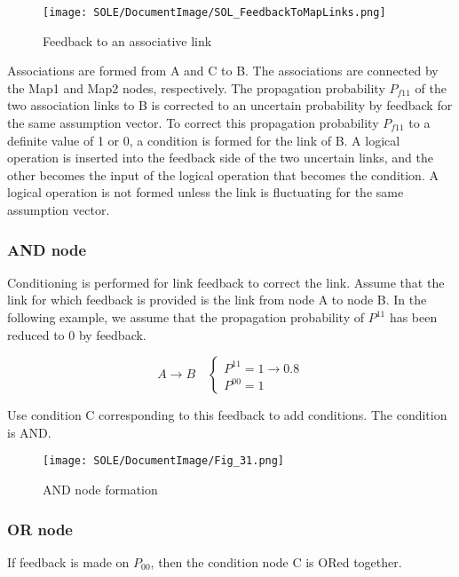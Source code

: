 \documentclass[12pt]{article}
\begin{document}
\begin{figure}[ht]
  \centering
  \texttt{[image: SOLE/DocumentImage/SOL\_FeedbackToMapLinks.png]}
  \caption{Feedback to an associative link}
  \label{fig:feedback_to_an_associative_link}
\end{figure}

Associations are formed from A and C to B. The associations are
connected by the Map1 and Map2 nodes, respectively. The propagation
probability \(P_{f11}\) of the two association links to B is corrected
to an uncertain probability by feedback for the same assumption vector.
To correct this propagation probability \(P_{f11}\) to a definite value
of 1 or 0, a condition is formed for the link of B. A logical operation
is inserted into the feedback side of the two uncertain links, and the
other becomes the input of the logical operation that becomes the
condition. A logical operation is not formed unless the link is
fluctuating for the same assumption vector.

\subsubsection{AND node}\label{and-node}

Conditioning is performed for link feedback to correct the link. Assume
that the link for which feedback is provided is the link from node A to
node B. In the following example, we assume that the propagation
probability of \(P^{11}\) has been reduced to 0 by feedback.

\[A \rightarrow B \quad
\begin{cases}
P^{11}=1 \rightarrow 0.8 \\
P^{00}=1
\end{cases}
\]

Use condition C corresponding to this feedback to add conditions. The
condition is AND.

\begin{figure}[ht]
  \centering
  \texttt{[image: SOLE/DocumentImage/Fig\_31.png]}
  \caption{AND node formation}
  \label{fig:and_node_formation}
\end{figure}

\subsubsection{OR node}\label{or-node}

If feedback is made on \(P_{00}\), then the condition node C is ORed
together.
\end{document}
